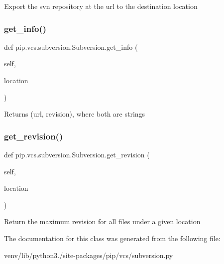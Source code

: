 \begin{DoxyVerb}Export the svn repository at the url to the destination location\end{DoxyVerb}
 \mbox{\label{classpip_1_1vcs_1_1subversion_1_1_subversion_aa2b3eebacf643076bda129359e6ea31b}} 
\subsubsection{\texorpdfstring{get\+\_\+info()}{get\_info()}}
{\footnotesize\ttfamily def pip.\+vcs.\+subversion.\+Subversion.\+get\+\_\+info (\begin{DoxyParamCaption}\item[{}]{self,  }\item[{}]{location }\end{DoxyParamCaption})}

\begin{DoxyVerb}Returns (url, revision), where both are strings\end{DoxyVerb}
 \mbox{\label{classpip_1_1vcs_1_1subversion_1_1_subversion_ab231b21b74c518d4f97069c6f49e8be5}} 
\subsubsection{\texorpdfstring{get\+\_\+revision()}{get\_revision()}}
{\footnotesize\ttfamily def pip.\+vcs.\+subversion.\+Subversion.\+get\+\_\+revision (\begin{DoxyParamCaption}\item[{}]{self,  }\item[{}]{location }\end{DoxyParamCaption})}

\begin{DoxyVerb}Return the maximum revision for all files under a given location
\end{DoxyVerb}
 

The documentation for this class was generated from the following file\+:\begin{DoxyCompactItemize}
\item 
venv/lib/python3./site-\/packages/pip/vcs/subversion.\+py\end{DoxyCompactItemize}
